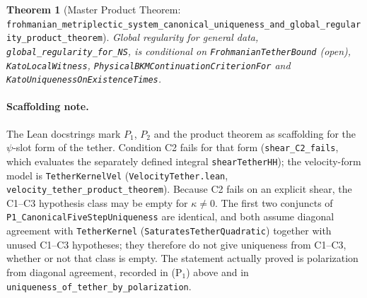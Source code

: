 \documentclass[11pt,a4paper]{article}
\newtheorem{theorem}{Theorem}[section]
\theoremstyle{definition}
\begin{document}
\begin{theorem}[Master Product Theorem: \texttt{frohmanian\_metriplectic\_system\_canonical\_uniqueness\_and\_global\_regularity\_product\_theorem}]
Global regularity for general data, \texttt{global\_regularity\_for\_NS}, is conditional on \texttt{FrohmanianTetherBound} (open), \texttt{KatoLocalWitness}, \texttt{PhysicalBKMContinuationCriterionFor} and \texttt{KatoUniquenessOnExistenceTimes}.
\end{theorem}

\paragraph{Scaffolding note.} The Lean docstrings mark $P_1$, $P_2$ and the product theorem as scaffolding for the $\psi$-slot form of the tether. Condition C2 fails for that form (\texttt{shear\_C2\_fails}, which evaluates the separately defined integral \texttt{shearTetherHH}); the velocity-form model is \texttt{TetherKernelVel} (\texttt{VelocityTether.lean}, \texttt{velocity\_tether\_product\_theorem}). Because C2 fails on an explicit shear, the C1--C3 hypothesis class may be empty for $\kappa\neq0$. The first two conjuncts of \texttt{P1\_CanonicalFiveStepUniqueness} are identical, and both assume diagonal agreement with \texttt{TetherKernel} (\texttt{SaturatesTetherQuadratic}) together with unused C1--C3 hypotheses; they therefore do not give uniqueness from C1--C3, whether or not that class is empty. The statement actually proved is polarization from diagonal agreement, recorded in (P$_1$) above and in \texttt{uniqueness\_of\_tether\_by\_polarization}.
\end{document}
